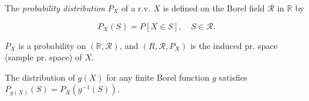 The \textit{probability distribution} $P_X$ of a r.v. $X$ is defined on the Borel field $\mathcal{R}$ in $\mathbb{R}$ by

$$P_X(S) = P[X \in S], \quad S \in \mathcal{R}.$$

$P_X$ is a probability on $(\mathbb{R}, \mathcal{R})$, and $(R, \mathcal{R}, P_X)$ is the induced pr. space (sample pr. space) of $X$.

The distribution of $g(X)$ for any finite Borel function $g$ satisfies $P_{g(X)}(S) = P_X(g^{-1}(S))$.

